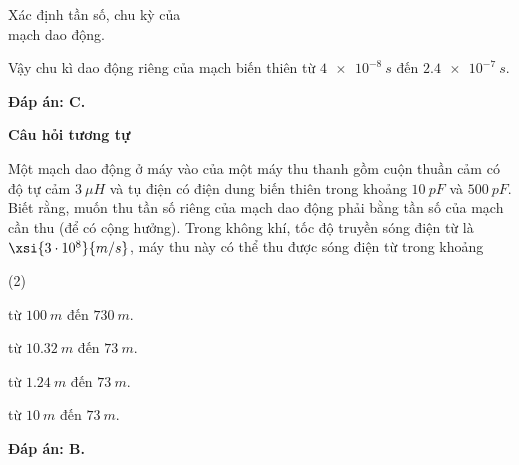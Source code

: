 \begin{dang}{Xác định tần số, chu kỳ của\\ mạch dao động.}
{		Vậy chu kì dao động riêng của mạch biến thiên từ $\SI{4 e-8}{s}$ đến $\SI{2,4 e-7}{s}$.
		
		\textbf{Đáp án: C.}
		
		
		\begin{center}
			\textbf{Câu hỏi tương tự}
		\end{center}
		
		Một mạch dao động ở máy vào của một máy thu thanh gồm cuộn thuần cảm có độ tự cảm $\SI{3}{\mu H}$ và tụ điện có điện dung biến thiên trong khoảng $\SI{10}{pF}$ và $\SI{500}{pF}$. Biết rằng, muốn thu tần số riêng của mạch dao động phải bằng tần số của mạch cần thu (để có cộng hưởng). Trong không khí, tốc độ truyền sóng điện từ là $\xsi{3\cdot10^{8}}{m/s}$, máy thu này có thể thu được sóng điện từ trong khoảng
		\begin{mcq}(2)
			\item từ $\SI{100}{m}$ đến $\SI{730}{m}$. 
			\item từ $\SI{10,32}{m}$ đến $\SI{73}{m}$. 
			\item từ $\SI{1,24}{m}$ đến $\SI{73}{m}$. 
			\item từ $\SI{10}{m}$ đến $\SI{73}{m}$. 
		\end{mcq}
		
		\textbf{Đáp án: B.}
		
	}
		
\end{dang}

